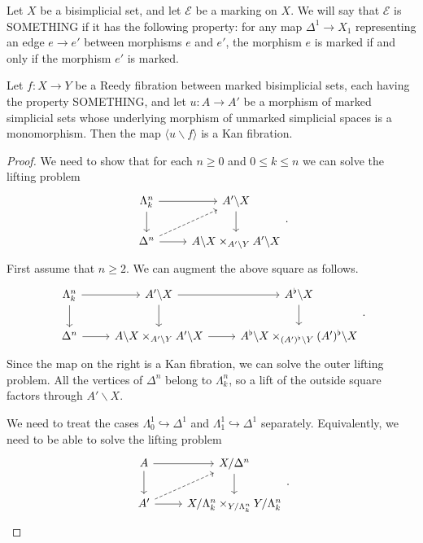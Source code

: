 \documentclass[main.tex]{subfiles}
\begin{document}
\begin{definition}
  Let $X$ be a bisimplicial set, and let $\mathcal{E}$ be a marking on $X$. We will say that $\mathcal{E}$ is SOMETHING if it has the following property: for any map $\Delta^{1} \to X_{1}$ representing an edge $e \to e'$ between morphisms $e$ and $e'$, the morphism $e$ is marked if and only if the morphism $e'$ is marked.
\end{definition}

\begin{proposition}
  Let $f\colon X \to Y$ be a Reedy fibration between marked bisimplicial sets, each having the property SOMETHING, and let $u\colon A \to A'$ be a morphism of marked simplicial sets whose underlying morphism of unmarked simplicial spaces is a monomorphism. Then the map $\langle u \backslash f \rangle$ is a Kan fibration.
\end{proposition}
\begin{proof}
  We need to show that for each $n \geq 0$ and $0 \leq k \leq n$ we can solve the lifting problem
  \begin{equation*}
    \begin{tikzcd}
      \Lambda^{n}_{k}
      \arrow[r]
      \arrow[d]
      & A' \backslash X
      \arrow[d]
      \\
      \Delta^{n}
      \arrow[r]
      \arrow[ur, dashed]
      & A \backslash X \times_{A' \backslash Y} A' \backslash X
    \end{tikzcd}.
  \end{equation*}
  First assume that $n \geq 2$. We can augment the above square as follows.
  \begin{equation*}
    \begin{tikzcd}
      \Lambda^{n}_{k}
      \arrow[r]
      \arrow[d]
      & A' \backslash X
      \arrow[r]
      \arrow[d]
      & A^{\flat} \backslash X
      \arrow[d]
      \\
      \Delta^{n}
      \arrow[r]
      & A \backslash X \times_{A' \backslash Y} A' \backslash X
      \arrow[r]
      & A^{\flat} \backslash X \times_{(A')^{\flat} \backslash Y} (A')^{\flat} \backslash X
    \end{tikzcd}.
  \end{equation*}
  Since the map on the right is a Kan fibration, we can solve the outer lifting problem. All the vertices of $\Delta^{n}$ belong to $\Lambda^{n}_{k}$, so a lift of the outside square factors through $A' \backslash X$.

  We need to treat the cases $\Lambda^{1}_{0} \hookrightarrow \Delta^{1}$ and $\Lambda^{1}_{1} \hookrightarrow \Delta^{1}$ separately.
  Equivalently, we need to be able to solve the lifting problem
  \begin{equation*}
    \begin{tikzcd}
      A
      \arrow[r]
      \arrow[d]
      & X / \Delta^{n}
      \arrow[d]
      \\
      A'
      \arrow[r]
      \arrow[ur, dashed]
      & X / \Lambda^{n}_{k} \times_{Y / \Lambda^{n}_{k}} Y / \Lambda^{n}_{k}
    \end{tikzcd}.
  \end{equation*}
\end{proof}
\end{document}
